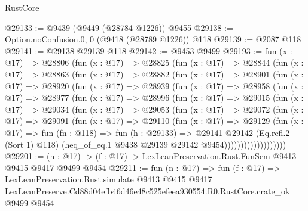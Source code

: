 \begin{lexlean}{RustCore}
\begin{coremodule}
@29133 := @9439 (@9449 (@28784 @1226)) @9455
@29138 := Option.noConfusion.{0, 0} (@9418 (@28789 @1226)) @118
@29139 := @2087 @118
@29141 := @29138 @29139 @118
@29142 := @9453 @9499
@29193 := fun (x : @17) =>
  @28806
    (fun (x : @17) =>
    @28825
      (fun (x : @17) =>
      @28844
        (fun (x : @17) =>
        @28863
          (fun (x : @17) =>
          @28882
            (fun (x : @17) =>
            @28901
              (fun (x : @17) =>
              @28920
                (fun (x : @17) =>
                @28939
                  (fun (x : @17) =>
                  @28958
                    (fun (x : @17) =>
                    @28977
                      (fun (x : @17) =>
                      @28996
                        (fun (x : @17) =>
                        @29015
                          (fun (x : @17) =>
                          @29034
                            (fun (x : @17) =>
                            @29053
                              (fun (x : @17) =>
                              @29072
                                (fun (x : @17) =>
                                @29091
                                  (fun (x : @17) =>
                                  @29110
                                    (fun (x : @17) =>
                                    @29129
                                      (fun (x : @17) =>
                                      fun (fn : @118) =>
                                      fun (h : @29133) =>
                                      @29141
                                        @29142
                                        (Eq.refl.{2} (Sort 1) @118)
                                        (heq_of_eq.{1} @9438 @29139 @29142 @9454)))))))))))))))))))
@29201 := (n : @17) -> (f : @17) -> LexLeanPreservation.Rust.FunSem @9413 @9415 @9417 @9499 @9454
@29211 := fun (n : @17) =>
  fun (f : @17) =>
  LexLeanPreservation.Rust.simulate
    @9413
    @9415
    @9417
    LexLeanPreserve.Cd88d04efb46d46e48c525efeea930554.R0.RustCore.crate_ok
    @9499
    @9454
\end{coremodule}
\end{lexlean}
